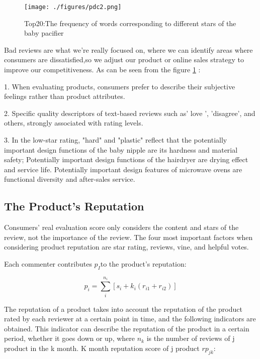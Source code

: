 \documentclass{mcmthesis}
\newcommand{\upcite}[1]{\textsuperscript{\textsuperscript{\cite{#1}}}}
\begin{document}
\begin{figure}[H]
	\centering
	\texttt{[image: ./figures/pdc2.png]}
	\caption{Top20:The frequency of words corresponding to different stars of the baby pacifier} \label{pdc1}
\end{figure}

Bad reviews are what we're really focused on, where we can identify areas where consumers are dissatisfied,so we adjust our product or online sales strategy to improve our competitiveness. As can be seen from the figure \ref{pdc1} :

1. When evaluating products, consumers prefer to describe their subjective feelings rather than product attributes.

2. Specific quality descriptors of text-based reviews such as' love ', 'disagree', and others, strongly associated with rating levels.

3. In the low-star rating, "hard" and "plastic" reflect that the potentially important design functions of the baby nipple are its hardness and material safety; Potentially important design functions of the hairdryer are drying effect and service life. Potentially important design features of microwave ovens are functional diversity and after-sales service.

\subsection{The Product’s Reputation}

Consumers' real evaluation score only considers the content and stars of the review, not the importance of the review. The four most important factors when considering product reputation are star rating, reviews, vine, and helpful votes. \upcite{WannThe}

Each commenter contributes $p_{I}$to the product's reputation:

\begin{equation}\label{q2}
p_{i}=\sum_{i}^{n_i}[s_{i}+k_{i}(r_{i1}+r_{i2})]
\end{equation}

The reputation of a product takes into account the reputation of the product rated by each reviewer at a certain point in time, and the following indicators are obtained. This indicator can describe the reputation of the product in a certain period, whether it goes down or up, where $n_k$ is the number of reviews of j product in the k month. K month reputation score of j product $rp_{jk}$:
\end{document}
